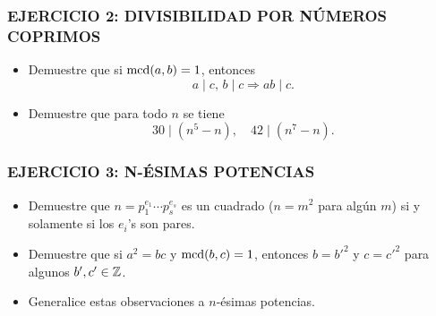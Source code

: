 \begin{frame}
  \frametitle{EJERCICIO 2: DIVISIBILIDAD POR NÚMEROS COPRIMOS}

  \begin{itemize}
  \item<2-> Demuestre que si $\operatorname{mcd} (a,b) = 1$, entonces
    $$a \mid c, \, b \mid c \Longrightarrow ab \mid c.$$

  \item<3-> Demuestre que para todo $n$ se tiene
    \[
      30 \mid (n^5 - n),
      \quad
      42 \mid (n^7 - n).
    \]

  \end{itemize}
\end{frame}

\begin{frame}
  \frametitle{EJERCICIO 3: N-ÉSIMAS POTENCIAS}

  \begin{itemize}
  \item<2-> Demuestre que $n = p_1^{e_1}\cdots p_s^{e_s}$ es un cuadrado
    ($n = m^2$ para algún $m$) si y solamente si los $e_i$'s son pares.

  \item<3-> Demuestre que si $a^2 = bc$ y $\operatorname{mcd} (b,c) = 1$, entonces
    $b = b'^2$ y $c = c'^2$ para algunos $b', c' \in \mathbb{Z}$.

  \item<4-> Generalice estas observaciones a $n$-ésimas potencias.
  \end{itemize}
\end{frame}

